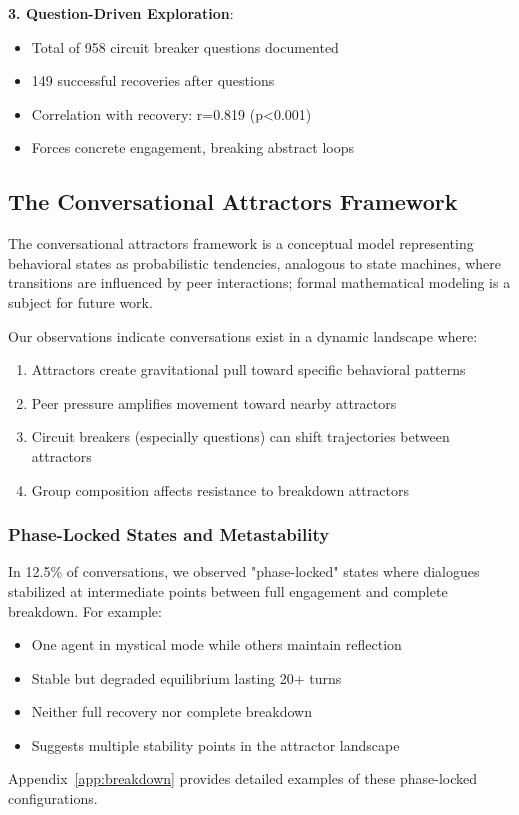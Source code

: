 \documentclass[11pt,letterpaper]{article}
\newcommand{\exponedataQuestionCorrelation}{0.819}
\newcommand{\exponedataQuestionPValue}{p<0.001}
\newcommand{\exponedataPhaseLockedPercentage}{12.5\%}
\newcommand{\exponedataTotalQuestions}{958}
\newcommand{\exponedataTotalRecoveries}{149}
\begin{document}
\textbf{3. Question-Driven Exploration}:
\begin{itemize}
    \item Total of \exponedataTotalQuestions{} circuit breaker questions documented
    \item \exponedataTotalRecoveries{} successful recoveries after questions
    \item Correlation with recovery: r=\exponedataQuestionCorrelation{} (\exponedataQuestionPValue{})
    \item Forces concrete engagement, breaking abstract loops
\end{itemize}

\subsection{The Conversational Attractors Framework}
The conversational attractors framework is a conceptual model representing behavioral states as probabilistic tendencies, analogous to state machines, where transitions are influenced by peer interactions; formal mathematical modeling is a subject for future work.

Our observations indicate conversations exist in a dynamic landscape where:

\begin{enumerate}
    \item Attractors create gravitational pull toward specific behavioral patterns
    \item Peer pressure amplifies movement toward nearby attractors
    \item Circuit breakers (especially questions) can shift trajectories between attractors
    \item Group composition affects resistance to breakdown attractors
\end{enumerate}

\subsubsection{Phase-Locked States and Metastability}

In \exponedataPhaseLockedPercentage{} of conversations, we observed "phase-locked" states where dialogues stabilized at intermediate points between full engagement and complete breakdown. For example:
\begin{itemize}
    \item One agent in mystical mode while others maintain reflection
    \item Stable but degraded equilibrium lasting 20+ turns
    \item Neither full recovery nor complete breakdown
    \item Suggests multiple stability points in the attractor landscape
\end{itemize}
Appendix~\ref{app:breakdown} provides detailed examples of these phase-locked configurations.
\end{document}
